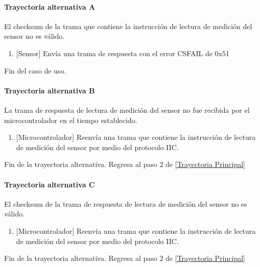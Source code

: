 \paragraph{Trayectoria alternativa A} \label{SUB-M-CU1.3:TA}
	El checksum de la trama que contiene la instrucción de lectura de medición del sensor no es válido.
	\begin{enumerate}[label=A\arabic*.]
		\item {[Sensor]} Envía una trama de respuesta con el error CSFAIL de 0x51  
	\end{enumerate}
	Fin del caso de uso.

\paragraph{Trayectoria alternativa B} \label{SUB-M-CU1.3:TB}
	La trama de respuesta de lectura de medición del sensor no fue recibida por el microcontrolador en el tiempo establecido.
	\begin{enumerate}[label=B\arabic*.]
		\item {[Microcontrolador]} Reenvía una trama que contiene la instrucción de lectura de medición del sensor por medio del protocolo IIC.  
	\end{enumerate}
	Fin de la trayectoria alternativa. Regresa al paso 2 de \hyperref[SUB-M-CU1.3:TP]{[Trayectoria Principal]}  
	
\paragraph{Trayectoria alternativa C} \label{SUB-M-CU1.3:TC}
	El checksum de la trama de respuesta de lectura de medición del sensor no es válido.
	\begin{enumerate}[label=C\arabic*.]
		\item {[Microcontrolador]} Reenvía una trama que contiene la instrucción de lectura de medición del sensor por medio del protocolo IIC.  
	\end{enumerate}
	Fin de la trayectoria alternativa. Regresa al paso 2 de \hyperref[SUB-M-CU1.3:TP]{[Trayectoria Principal]} 